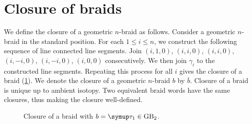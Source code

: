 \section{Closure of braids}

We define the closure of a geometric \(n\)-braid as follows. Consider a geometric \(n\)-braid in the standard position. For each \(1 \leq i \leq n\), we construct the following sequence of line connected line segments. Join \((i, 1, 0)\), \((i, i, 0)\), \((i, i, 0)\), \((i, -i, 0)\), \((i, -i, 0)\), \((i, 0, 0)\) consecutively. We then join \(\gamma_i\) to the constructed line segments. Repeating this process for all \(i\) gives the closure of a braid (\cref{fig:closure}). We denote the closure of a geometric \(n\)-braid \(b\) by \(\overline{b}\). Closure of a braid is unique up to ambient isotopy. Two equivalent braid words have the same closures, thus making the closure well-defined.

\begin{figure}[H]\centering
	\quad\quad{}
	\caption{Closure of a braid with \(b = \tauu_1 \in \GB_2\).}
	\label{fig:closure}
\end{figure}

